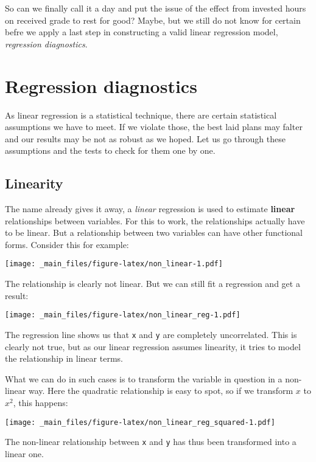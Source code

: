 \documentclass[
]{book}
\begin{document}
So can we finally call it a day and put the issue of the effect from invested
hours on received grade to rest for good? Maybe, but we still do not know for
certain befre we apply a last step in constructing a valid linear regression
model, \emph{regression diagnostics}.

\hypertarget{regression-diagnostics}{%
\section{Regression diagnostics}\label{regression-diagnostics}}

As linear regression is a statistical technique, there are certain statistical
assumptions we have to meet. If we violate those, the best laid plans may
falter and our results may be not as robust as we hoped.
Let us go through these assumptions and the tests to check for them one by one.

\hypertarget{linearity}{%
\subsection{Linearity}\label{linearity}}

The name already gives it away, a \emph{linear} regression is used to estimate
\textbf{linear} relationships between variables. For this to work, the relationships
actually have to be linear. But a relationship between two variables can have
other functional forms. Consider this for example:

\texttt{[image: \_main\_files/figure-latex/non\_linear-1.pdf]}

The relationship is clearly not linear. But we can still fit a regression and
get a result:

\texttt{[image: \_main\_files/figure-latex/non\_linear\_reg-1.pdf]}

The regression line shows us that \texttt{x} and \texttt{y} are completely uncorrelated. This
is clearly not true, but as our linear regression assumes linearity, it tries to
model the relationship in linear terms.

What we can do in such cases is to transform the variable in question in a
non-linear way. Here the quadratic relationship is easy to spot, so if we
transform \(x\) to \(x^2\), this happens:

\texttt{[image: \_main\_files/figure-latex/non\_linear\_reg\_squared-1.pdf]}

The non-linear relationship between \texttt{x} and \texttt{y} has thus been transformed into a
linear one.
\end{document}
